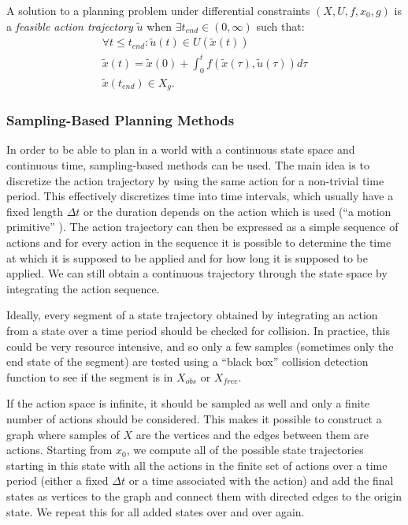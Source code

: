 \begin{defn}
	A solution to a planning problem under differential constraints $\left(X, U, f, x_0, g\right)$ is a \textit{feasible action trajectory} $\tilde{u}$ when $\exists t_{end} \in \left(0, \infty\right)$ such that:
	\begin{gather*}
	\forall t \leq t_{end}: \tilde{u}(t)\in U(\tilde{x}(t)) \\
	\tilde{x}(t) = \tilde{x}(0) + \int_0^t f(\tilde{x}(\tau), \tilde{u}(\tau)) d\tau \\
	\tilde{x}(t_{end})\in X_g.
	\end{gather*}
\end{defn}

\subsubsection{Sampling-Based Planning Methods}

In order to be able to plan in a world with a continuous state space and continuous time, sampling-based methods can be used. The main idea is to discretize the action trajectory by using the same action for a non-trivial time period. This effectively discretizes time into time intervals, which usually have a fixed length $\Delta t$ or the duration depends on the action which is used (``a motion primitive'' \cite[Section~14.2.3]{lavalle_2006}). The action trajectory can then be expressed as a simple sequence of actions and for every action in the sequence it is possible to determine the time at which it is supposed to be applied and for how long it is supposed to be applied. We can still obtain a continuous trajectory through the state space by integrating the action sequence.

Ideally, every segment of a state trajectory obtained by integrating an action from a state over a time period should be checked for collision. In practice, this could be very resource intensive, and so only a few samples (sometimes only the end state of the segment) are tested using a ``black box'' collision detection function to see if the segment is in $X_{obs}$ or $X_{free}$.

If the action space is infinite, it should be sampled as well and only a finite number of actions should be considered. This makes it possible to construct a graph where samples of $X$ are the vertices and the edges between them are actions. Starting from $x_0$, we compute all of the possible state trajectories starting in this state with all the actions in the finite set of actions over a time period (either a fixed $\Delta t$ or a time associated with the action) and add the final states as vertices to the graph and connect them with directed edges to the origin state. We repeat this for all added states over and over again.

